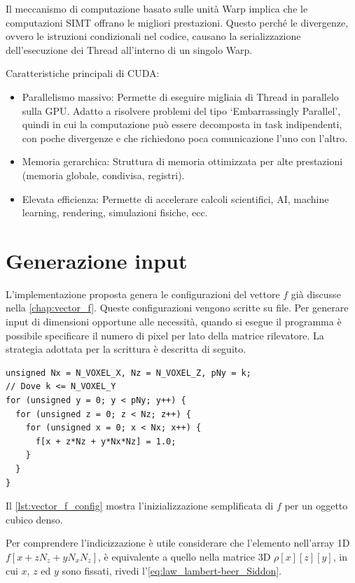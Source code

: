 \documentclass[12pt,a4paper]{report}
\begin{document}
Il meccanismo di computazione basato sulle unità Warp implica che le computazioni SIMT offrano le migliori prestazioni.
Questo perché le divergenze, ovvero le istruzioni condizionali nel codice, causano la serializzazione dell'esecuzione dei Thread
all'interno di un singolo Warp.

Caratteristiche principali di CUDA:
\begin{itemize}
  \item Parallelismo massivo: Permette di eseguire migliaia di Thread in parallelo sulla GPU. Adatto a risolvere problemi del
        tipo `Embarrassingly Parallel', quindi in cui la computazione può essere decomposta in task indipendenti, con poche
        divergenze e che richiedono poca comunicazione l'uno con l'altro.
  \item Memoria gerarchica: Struttura di memoria ottimizzata per alte prestazioni (memoria globale, condivisa, registri).
  \item Elevata efficienza: Permette di accelerare calcoli scientifici, AI, machine learning, rendering, simulazioni fisiche, ecc.
\end{itemize}

\section{Generazione input}

L'implementazione proposta genera le configurazioni del vettore \(f\) già discusse nella \autoref{chap:vector_f}.
Queste configurazioni vengono scritte su file.
Per generare input di dimensioni opportune alle necessità, quando si esegue il programma è possibile specificare il numero di
pixel per lato della matrice rilevatore.
La strategia adottata per la scrittura è descritta di seguito.

\begin{lstlisting}[language=CStyle, caption={Codice C per inizializzazione di \(f\) per un cubo.}, label={lst:vector_f_config}]
unsigned Nx = N_VOXEL_X, Nz = N_VOXEL_Z, pNy = k;
// Dove k <= N_VOXEL_Y
for (unsigned y = 0; y < pNy; y++) {
  for (unsigned z = 0; z < Nz; z++) {
    for (unsigned x = 0; x < Nx; x++) {
      f[x + z*Nz + y*Nx*Nz] = 1.0;
    }
  }
}
\end{lstlisting}

Il \autoref{lst:vector_f_config} mostra l'inizializzazione semplificata di \(f\) per un oggetto cubico denso.

Per comprendere l'indicizzazione è utile considerare che l'elemento nell'array 1D \(f[x + z N_z + y N_x N_z]\), è equivalente a
quello nella matrice 3D \(\rho[x][z][y]\), in cui \(x\), \(z\) ed \(y\)  sono fissati, rivedi l'\autoref{eq:law_lambert-beer_Siddon}.
\end{document}
